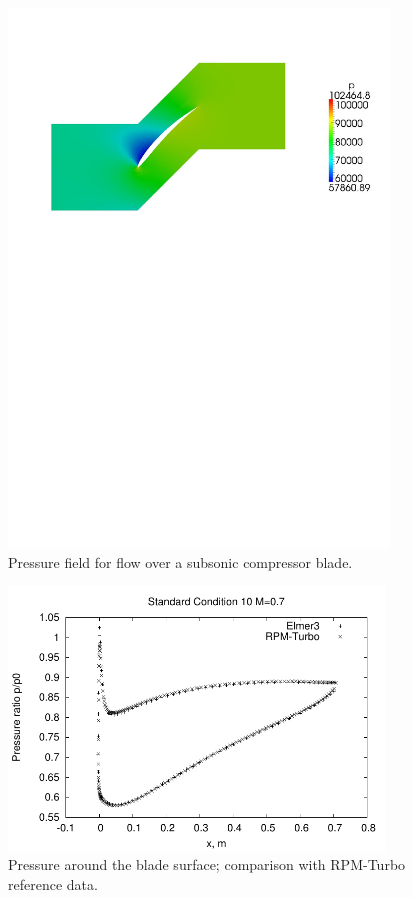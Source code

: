 \begin{figure}[htbp]
\begin{center}
\includegraphics[width=0.9\textwidth,viewport=24 495 570 817]{../2D/turbo_sc10_parametric/pressure-field.pdf}
\end{center}
\caption{Pressure field for flow over a subsonic compressor blade.}
\label{turbo-sc10-parametric-pressure-fig}
\end{figure}

\begin{figure}[htbp]
\begin{center}
\includegraphics[width=10cm]{../2D/turbo_sc10_parametric/surface_p.pdf}
\end{center}
\caption{Pressure around the blade surface; comparison with RPM-Turbo reference data.}
\label{turbo-sc10-parametric-surface-p-fig}
\end{figure}


